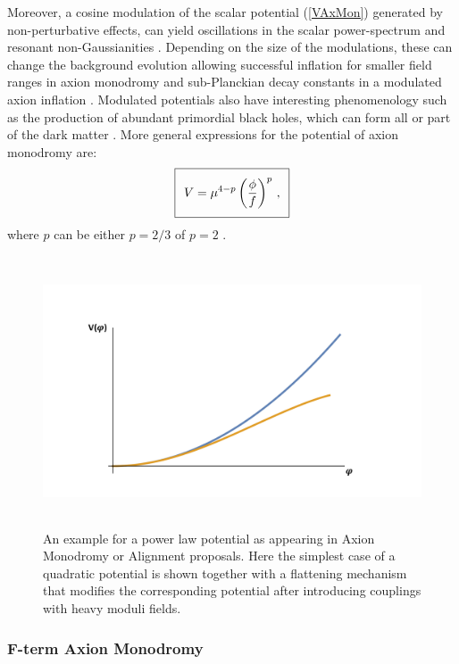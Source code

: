 Moreover, a cosine modulation of the scalar potential (\ref{VAxMon}) generated by non-perturbative effects, can yield oscillations in the scalar power-spectrum \cite{Flauger:2009ab,Peiris:2013opa} and resonant non-Gaussianities \cite{Hannestad:2009yx}. Depending on the size of the modulations, these can  change the background evolution allowing successful inflation for smaller field ranges in axion monodromy and sub-Planckian decay constants in a modulated axion inflation \cite{Parameswaran:2016qqq}. Modulated potentials also have interesting phenomenology such as the production of abundant primordial black holes, which can form all or part of the dark matter \cite{Ozsoy:2018flq}. More general expressions for the potential of axion monodromy are:
\begin{equation}
\setlength\fboxsep{0.25cm}
\setlength\fboxrule{0.4pt}
\boxed{
V = \mu^{4-p} \left(\frac{\phi}{f}\right)^p \,,
}
\end{equation}
where $p$ can be either $p=2/3$ \cite{Silverstein:2008sg} of $p=2$ \cite{Kaloper:2008fb,Berg:2009tg,Palti:2014kza}. 


\begin{figure}[t]
\begin{center}
\includegraphics[width=140mm,height=80mm]{Sections/Figures/FlatteningPotential.pdf} 
\caption{An example for a power law potential as appearing in Axion Monodromy or Alignment proposals. Here the simplest case of a quadratic potential is shown together with a flattening mechanism that modifies the corresponding potential after introducing couplings with heavy moduli fields.} 
\label{Fig:Flattening} 
\end{center}
\end{figure}


\subsubsection*{F-term Axion Monodromy}

